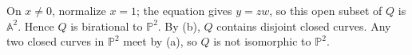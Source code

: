 On $x\ne0$, normalize $x=1$; the equation gives $y=zw$, so this open subset of $Q$ is $\mathbb A^2$. Hence $Q$ is birational to $\mathbb P^2$. By (b), $Q$ contains disjoint closed curves. Any two closed curves in $\mathbb P^2$ meet by (a), so $Q$ is not isomorphic to $\mathbb P^2$.
